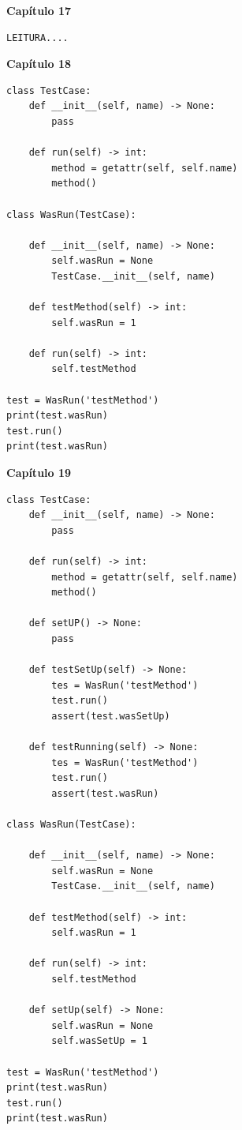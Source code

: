 \documentclass[a4paper,12pt]{article}
\newcommand{\capitulo}[1]{
    \vspace{1em}
    \noindent
    \colorbox{black!15}{
        \parbox{\dimexpr\linewidth-2\fboxsep}{
            \centering \Large \textbf{#1}
        }
    }
    \vspace{1em}
}
\begin{document}
\capitulo{Capítulo 17}
\begin{lstlisting}[style=pythonstyle]
LEITURA....
\end{lstlisting}

\capitulo{Capítulo 18}
\begin{lstlisting}[style=pythonstyle]
class TestCase:
    def __init__(self, name) -> None:
        pass

    def run(self) -> int:
        method = getattr(self, self.name)
        method()

class WasRun(TestCase):

    def __init__(self, name) -> None:
        self.wasRun = None 
        TestCase.__init__(self, name)

    def testMethod(self) -> int:
        self.wasRun = 1

    def run(self) -> int:
        self.testMethod

test = WasRun('testMethod')
print(test.wasRun)
test.run()
print(test.wasRun)
\end{lstlisting}


\capitulo{Capítulo 19}
\begin{lstlisting}[style=pythonstyle]
class TestCase:
    def __init__(self, name) -> None:
        pass

    def run(self) -> int:
        method = getattr(self, self.name)
        method()

    def setUP() -> None:
        pass

    def testSetUp(self) -> None:
        tes = WasRun('testMethod')
        test.run()
        assert(test.wasSetUp)

    def testRunning(self) -> None:
        tes = WasRun('testMethod')
        test.run()
        assert(test.wasRun)

class WasRun(TestCase):

    def __init__(self, name) -> None:
        self.wasRun = None 
        TestCase.__init__(self, name)

    def testMethod(self) -> int:
        self.wasRun = 1

    def run(self) -> int:
        self.testMethod

    def setUp(self) -> None:
        self.wasRun = None
        self.wasSetUp = 1

test = WasRun('testMethod')
print(test.wasRun)
test.run()
print(test.wasRun)
\end{lstlisting}
\end{document}
